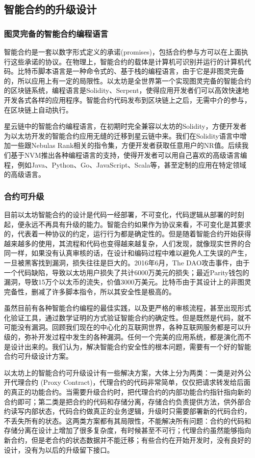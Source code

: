 \subsection{智能合约的升级设计}
\subsubsection{图灵完备的智能合约编程语言}
智能合约是一套以数字形式定义的承诺(promises)，包括合约参与方可以在上面执行这些承诺的协议。在物理上，智能合约的载体是计算机可识别并运行的计算机代码。比特币脚本语言是一种命令式的、基于栈的编程语言，由于它是非图灵完备的，所以应用上有一定的局限性。以太坊是全世界第一个实现图灵完备的智能合约的区块链系统，编程语言是Solidity、Serpent，使得应用开发者们可以高效快速地开发各式各样的应用程序。智能合约代码发布到区块链上之后，无需中介的参与，在区块链上自动执行。

星云链中的智能合约编程语言，在初期时完全兼容以太坊的Solidity，方便开发者为以太坊开发的智能合约应用无缝的迁移到星云链中来。我们在Solidity语言中增加一些跟Nebulas Rank相关的指令集，方便开发者获取任意用户的NR值。后续我们基于NVM推出各种编程语言的支持，使得开发者可以用自己喜欢的高级语言编程，例如Java、Python、Go、JavaScript、Scala等，甚至定制的应用在特定领域的高级语言。

\subsubsection{合约可升级}
目前以太坊智能合约的设计是代码一经部署，不可变化，代码逻辑从部署的时刻起，便永远不再具有升级的能力。智能合约如果作为协议来看，不可变化是其要求的，代表着一种协议的约定，运行行为都是确定性的。但是随着智能合约开始获得越来越多的使用，其流程和代码也变得越来越复杂，人们发现，就像现实世界的合同一样，如果没有认真审核的话，在设计和编码过程中难以避免人工失误的产生，一旦被黑客找到漏洞，损失往往是巨大的。2016年6月，The DAO攻击事件，由于一个代码缺陷，导致以太坊用户损失了共计6000万美元的损失；最近Parity钱包的漏洞，导致15万个以太币的流失，价值3000万美元。比特币由于其设计上的非图灵完备性，删减了许多脚本指令，所以其安全性是极高的。

虽然目前有各种智能合约编程的最佳实践，以及更严格的审核流程，甚至出现形式化验证工具，通过数学证明的方式验证智能合约的确定性。但是既然是代码，就不可能没有漏洞。回顾我们现在的中心化的互联网世界，各种互联网服务都是可以升级的，弥补开发过程中发生的各种漏洞。任何一个完美的应用系统，都是演化而不是设计出来的。我们认为，解决智能合约安全性的根本问题，需要有一个好的智能合约可升级设计方案。

以太坊上的智能合约可升级设计有一些解决方案，大体上分为两类：一类是对外公开代理合约 (Proxy Contract)，代理合约的代码非常简单，仅仅把请求转发给后面的真正的功能合约。当需要升级合约时，把代理合约的内部功能合约指针指向新的合约即可；第二类是把合约的代码和存储分离，存储合约负责提供方法，供外部合约读写内部状态，代码合约做真正的业务逻辑，升级时只需要部署新的代码合约，不丢失所有的状态。这两类方案都有其局限性，不能解决所有问题：合约的代码和存储分离在设计上增加了很多复杂度，有时候甚至不可行；代理合约虽然能够指向新合约，但是老合约的状态数据并不能迁移；有些合约在开始开发时，没有良好的设计，没有为以后的升级留下接口。

